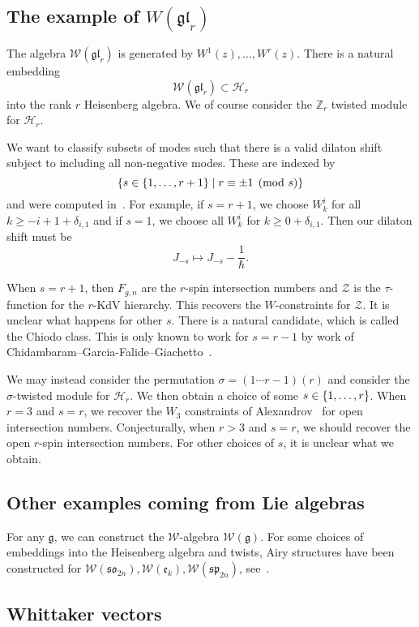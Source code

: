 \documentclass{amsart}
\theoremstyle{definition}
\theoremstyle{remark}
\theoremstyle{plain}
\theoremstyle{definition}
\theoremstyle{remark}
\newcommand{\Z}{\mathbb{Z}}
\newcommand{\g}{\mathfrak{g}}
\newcommand{\mc}[1]{\mathcal{#1}}
\newcommand{\mf}[1]{\mathfrak{#1}}
\newcommand{\1}{\mathbf{1}}
\newcommand{\2}{\mathbf{2}}
\newcommand{\3}{\mathbf{3}}
\begin{document}
\subsection{The example of $W(\mf{gl}_r)$}

The algebra $\mc{W}(\mf{gl}_r)$ is generated by $W^1(z), \ldots, W^r(z)$. There is a natural embedding
\[ \mc{W}(\mf{gl}_r) \subset \mc{H}_r \]
into the rank $r$ Heisenberg algebra. We of course consider the $\Z_r$ twisted module for $\mc{H}_r$. 

We want to classify subsets of modes such that there is a valid dilaton shift subject to including all non-negative modes. These are indexed by
\[ \qty{s \in \qty{1, \ldots, r+1} \mid r \equiv \pm 1 \pmod{s}} \]
and were computed in~\cite{airywliealg}.
For example, if $s = r+1$, we choose $W_k^i$ for all $k \geq -i + 1 + \delta_{i, 1}$ and if $s = 1$, we choose all $W_k^i$ for $k \geq 0 + \delta_{i,1}$. Then our dilaton shift must be
\[ J_{-s} \mapsto J_{-s} - \frac{1}{\hslash}. \]

When $s = r+1$, then $F_{g, n}$ are the $r$-spin intersection numbers and $\mc{Z}$ is the $\tau$-function for the $r$-KdV hierarchy. This recovers the $W$-constraints for $\mc{Z}$. It is unclear what happens for other $s$. There is a natural candidate, which is called the Chiodo class. This is only known to work for $s=r-1$ by work of Chidambaram--Garcia-Falide--Giachetto~\cite{negrspin}.

We may instead consider the permutation $\sigma = (1 \cdots r-1)(r)$ and consider the $\sigma$-twisted module for $\mc{H}_r$. We then obtain a choice of some $s \in \qty{1, \ldots, r}$. When $r=3$ and $s=r$, we recover the $W_3$ constraints of Alexandrov~\cite{openintnumber} for open intersection numbers. Conjecturally, when $r > 3$ and $s = r$, we should recover the open $r$-spin intersection numbers. For other choices of $s$, it is unclear what we obtain.

\subsection{Other examples coming from Lie algebras}

For any $\mf{g}$, we can construct the $\mc{W}$-algebra $\mc{W}(\g)$. For some choices of embeddings into the Heisenberg algebra and twists, Airy structures have been constructed for $\mc{W}(\mf{so}_{2n}), \mc{W}(\mf{e}_k), \mc{W}(\mf{sp}_{2n})$, see~\cites{airywliealg}{airysp2n}.

\subsection{Whittaker vectors}
\end{document}
